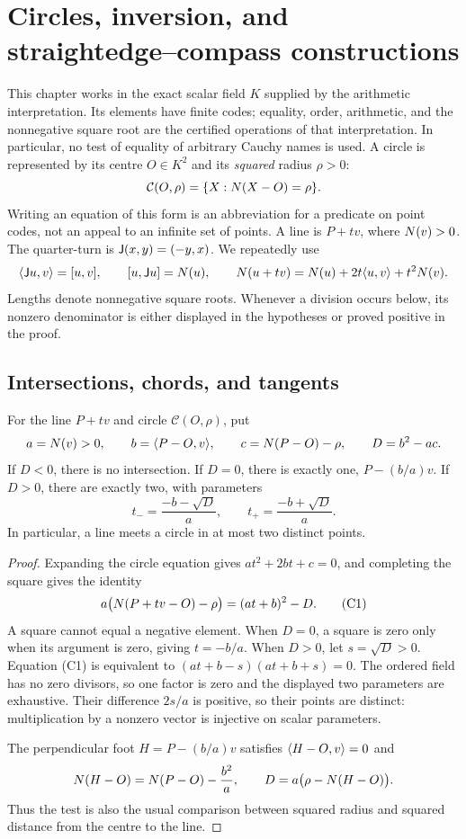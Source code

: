 \section{Circles, inversion, and straightedge--compass constructions}
\label{sec:circles}

This chapter works in the exact scalar field $K$ supplied by the arithmetic
interpretation.  Its elements have finite codes; equality, order, arithmetic,
and the nonnegative square root are the certified operations of that
interpretation.  In particular, no test of equality of arbitrary Cauchy names
is used.  A circle is represented by its centre $O\in K^2$ and its
\emph{squared} radius $\rho>0$:
\[
  \mathcal C(O,\rho)=\{X:N(X-O)=\rho\}.
\]
Writing an equation of this form is an abbreviation for a predicate on point
codes, not an appeal to an infinite set of points.  A line is $P+tv$, where
$N(v)>0$.  The quarter-turn is $\mathsf J(x,y)=(-y,x)$.  We repeatedly use
\[
 \langle \mathsf J u,v\rangle=[u,v],\qquad
 [u,\mathsf J u]=N(u),\qquad
 N(u+tv)=N(u)+2t\langle u,v\rangle+t^2N(v).
\]
Lengths denote nonnegative square roots.  Whenever a division occurs below,
its nonzero denominator is either displayed in the hypotheses or proved
positive in the proof.

\subsection{Intersections, chords, and tangents}

\begin{theorem}
\label{circ:line-intersection}
For the line $P+tv$ and circle $\mathcal C(O,\rho)$, put
\[
 a=N(v)>0,\qquad b=\langle P-O,v\rangle,\qquad
 c=N(P-O)-\rho,\qquad D=b^2-ac.
\]
If $D<0$, there is no intersection.  If $D=0$, there is exactly one,
$P-(b/a)v$.  If $D>0$, there are exactly two, with parameters
\[
 t_-=\frac{-b-\sqrt D}{a},\qquad t_+=\frac{-b+\sqrt D}{a}.
\]
In particular, a line meets a circle in at most two distinct points.
\end{theorem}
\begin{proof}
Expanding the circle equation gives $at^2+2bt+c=0$, and completing the
square gives the identity
\[
 a\bigl(N(P+tv-O)-\rho\bigr)=(at+b)^2-D.       \tag{C1}
\]
A square cannot equal a negative element.  When $D=0$, a square is zero
only when its argument is zero, giving $t=-b/a$.  When $D>0$, let
$s=\sqrt D>0$.  Equation (C1) is equivalent to
$(at+b-s)(at+b+s)=0$.  The ordered field has no zero divisors, so one factor
is zero and the displayed two parameters are exhaustive.  Their difference
$2s/a$ is positive, so their points are distinct: multiplication by a
nonzero vector is injective on scalar parameters.

The perpendicular foot $H=P-(b/a)v$ satisfies
$\langle H-O,v\rangle=0$ and
\[
 N(H-O)=N(P-O)-\frac{b^2}{a},\qquad
 D=a\bigl(\rho-N(H-O)\bigr).
\]
Thus the test is also the usual comparison between squared radius and
squared distance from the centre to the line.
\end{proof}

